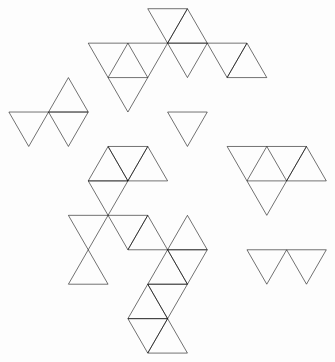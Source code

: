 \documentclass{article}\usepackage{tikz}
\begin{document}
\[\begin{tikzpicture}
\draw (-1.5,2.598076211353316)--(-2.0,3.4641016151377544)--(-1.0,3.4641016151377544)--cycle;
\draw (-2.0,1.7320508075688772)--(-2.5,2.598076211353316)--(-3.0,1.7320508075688772)--cycle;
\draw (-2.0,0.0)--(-1.5,0.8660254037844386)--(-1.0,0.0)--cycle;
\draw (0.0,3.4641016151377544)--(1.0,3.4641016151377544)--(0.5,4.330127018922193)--cycle;
\draw (-2.5,0.8660254037844386)--(-2.0,1.7320508075688772)--(-3.0,1.7320508075688772)--cycle;
\draw (-1.0,0.0)--(-1.5,0.8660254037844386)--(-0.5,0.8660254037844386)--cycle;
\draw (3.0,-1.7320508075688772)--(2.5,-2.598076211353316)--(2.0,-1.7320508075688772)--cycle;
\draw (0.5,0.8660254037844386)--(0.0,1.7320508075688772)--(1.0,1.7320508075688772)--cycle;
\draw (-1.5,-2.598076211353316)--(-2.0,-1.7320508075688772)--(-2.5,-2.598076211353316)--cycle;
\draw (4.0,0.0)--(3.5,0.8660254037844386)--(3.0,0.0)--cycle;
\draw (0.5,2.598076211353316)--(0.0,3.4641016151377544)--(1.0,3.4641016151377544)--cycle;
\draw (0.5,-2.598076211353316)--(1.0,-1.7320508075688772)--(0.0,-1.7320508075688772)--cycle;
\draw (2.5,0.8660254037844386)--(3.5,0.8660254037844386)--(3.0,0.0)--cycle;
\draw (2.5,-0.8660254037844386)--(2.0,0.0)--(3.0,0.0)--cycle;
\draw (0.0,3.4641016151377544)--(-0.5,2.598076211353316)--(-1.0,3.4641016151377544)--cycle;
\draw (2.5,0.8660254037844386)--(2.0,0.0)--(1.5,0.8660254037844386)--cycle;
\draw (3.5,-2.598076211353316)--(3.0,-1.7320508075688772)--(4.0,-1.7320508075688772)--cycle;
\draw (2.0,3.4641016151377544)--(1.5,2.598076211353316)--(1.0,3.4641016151377544)--cycle;
\draw (-1.0,1.7320508075688772)--(-1.5,2.598076211353316)--(-0.5,2.598076211353316)--cycle;
\draw (0.5,-4.330127018922193)--(0.0,-3.4641016151377544)--(-0.5,-4.330127018922193)--cycle;
\draw (0.0,-3.4641016151377544)--(-0.5,-2.598076211353316)--(-1.0,-3.4641016151377544)--cycle;
\draw (-4.0,1.7320508075688772)--(-3.0,1.7320508075688772)--(-3.5,0.8660254037844386)--cycle;
\draw (0.0,-1.7320508075688772)--(-0.5,-0.8660254037844386)--(-1.0,-1.7320508075688772)--cycle;
\draw (-0.5,-0.8660254037844386)--(-1.5,-0.8660254037844386)--(-1.0,-1.7320508075688772)--cycle;
\draw (-2.0,-1.7320508075688772)--(-1.5,-0.8660254037844386)--(-2.5,-0.8660254037844386)--cycle;
\draw (-2.0,0.0)--(-1.0,0.0)--(-1.5,-0.8660254037844386)--cycle;
\draw (0.5,-0.8660254037844386)--(0.0,-1.7320508075688772)--(1.0,-1.7320508075688772)--cycle;
\draw (-0.5,-2.598076211353316)--(0.5,-2.598076211353316)--(0.0,-1.7320508075688772)--cycle;
\draw (0.0,3.4641016151377544)--(-0.5,4.330127018922193)--(0.5,4.330127018922193)--cycle;
\draw (2.0,3.4641016151377544)--(1.5,2.598076211353316)--(2.5,2.598076211353316)--cycle;
\draw (-1.0,0.0)--(0.0,0.0)--(-0.5,0.8660254037844386)--cycle;
\draw (0.0,-3.4641016151377544)--(0.5,-2.598076211353316)--(-0.5,-2.598076211353316)--cycle;
\draw (0.0,-3.4641016151377544)--(-0.5,-4.330127018922193)--(-1.0,-3.4641016151377544)--cycle;
\end{tikzpicture}
\]
\end{document}
